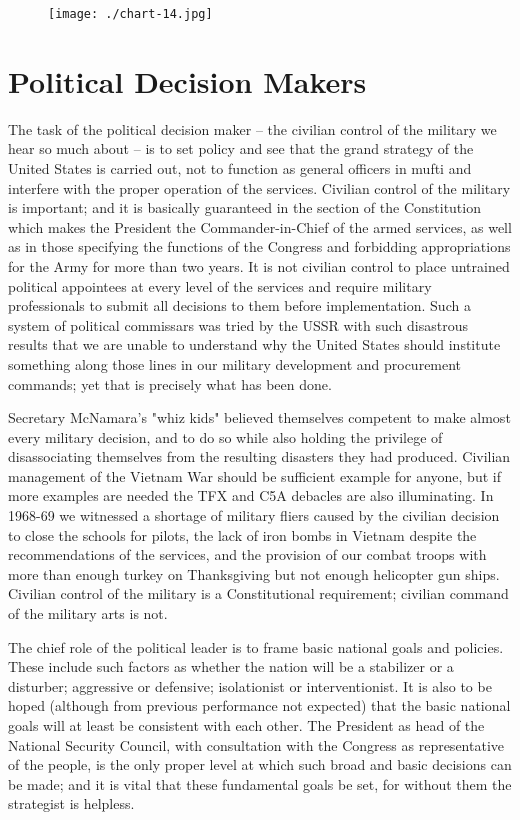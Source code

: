 \begin{figure}
    \texttt{[image: ./chart-14.jpg]}
    \label{fig:chart-14}
\end{figure}

\section{Political Decision Makers}
The task of the political decision maker -- the civilian control of the military we hear so much about -- is to set policy and see that the grand strategy of the United States is carried out, not to function as general officers in mufti and interfere with the proper operation of the services. Civilian control of the military is important; and it is basically guaranteed in the section of the Constitution which makes the President the Commander-in-Chief of the armed services, as well as in those specifying the functions of the Congress and forbidding appropriations for the Army for more than two years. It is not civilian control to place untrained political appointees at every level of the services and require military professionals to submit all decisions to them before implementation. Such a system of political commissars was tried by the USSR with such disastrous results that we are unable to understand why the United States should institute something along those lines in our military development and procurement commands; yet that is precisely what has been done.

Secretary McNamara's "whiz kids" believed themselves competent to make almost every military decision, and to do so while also holding the privilege of disassociating themselves from the resulting disasters they had produced. Civilian management of the Vietnam War should be sufficient example for anyone, but if more examples are needed the TFX and C5A debacles are also illuminating. In 1968-69 we witnessed a shortage of military fliers caused by the civilian decision to close the schools for pilots, the lack of iron bombs in Vietnam despite the recommendations of the services, and the provision of our combat troops with more than enough turkey on Thanksgiving but not enough helicopter gun ships. Civilian control of the military is a Constitutional requirement; civilian command of the military arts is not.

The chief role of the political leader is to frame basic national goals and policies. These include such factors as whether the nation will be a stabilizer or a disturber; aggressive or defensive; isolationist or interventionist. It is also to be hoped (although from previous performance not expected) that the basic national goals will at least be consistent with each other. The President as head of the National Security Council, with consultation with the Congress as representative of the people, is the only proper level at which such broad and basic decisions can be made; and it is vital that these fundamental goals be set, for without them the strategist is helpless.

